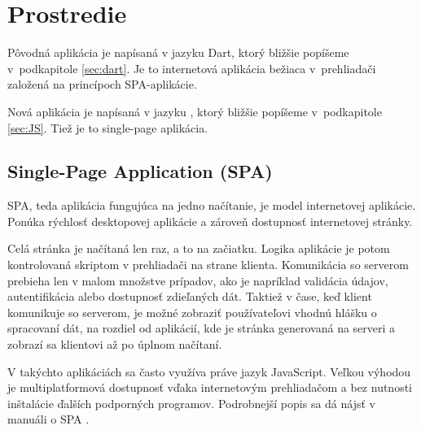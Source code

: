\chapter{Prostredie}

\label{kap:prostredie} %

Pôvodná aplikácia je napísaná v jazyku Dart, ktorý bližšie popíšeme 
v~podkapitole \ref{sec:dart}. Je to internetová aplikácia bežiaca 
v~prehliadači založená na princípoch SPA-aplikácie.

Nová aplikácia je napísaná v jazyku \JS{}, ktorý bližšie popíšeme 
v~podkapitole \ref{sec:JS}. Tiež je to single-page aplikácia.

\section{Single-Page Application (SPA)}
SPA, teda aplikácia fungujúca na jedno načítanie, je model internetovej aplikácie. Ponúka rýchlosť desktopovej aplikácie a zároveň dostupnosť internetovej stránky.

Celá stránka je načítaná len raz, a to na začiatku. Logika aplikácie je potom kontrolovaná skriptom v prehliadači na strane klienta. 
Komunikácia so serverom prebieha len v malom množstve prípadov, ako je napríklad validácia údajov, autentifikácia alebo dostupnosť zdieľaných dát. 
Taktiež v čase, keď klient komunikuje so serverom, je možné zobraziť používateľovi vhodnú hlášku o spracovaní dát, na rozdiel od aplikácií, kde je stránka generovaná na serveri a zobrazí sa klientovi až po úplnom načítaní.

V takýchto aplikáciách sa často využíva práve jazyk JavaScript. Veľkou výhodou je multiplatformová dostupnosť vďaka internetovým prehliadačom a bez nutnosti inštalácie ďalších podporných programov. Podrobnejší popis sa dá nájsť v manuáli o SPA \cite{SPA}.


